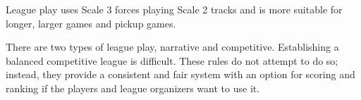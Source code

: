 League play uses Scale 3 forces playing Scale 2 tracks and is more suitable for longer, larger games and pickup games.

There are two types of league play, narrative and competitive.
Establishing a balanced competitive league is difficult.
These rules do not attempt to do so; instead, they provide a consistent and fair system with an option for scoring and ranking if the players and league organizers want to use it.
